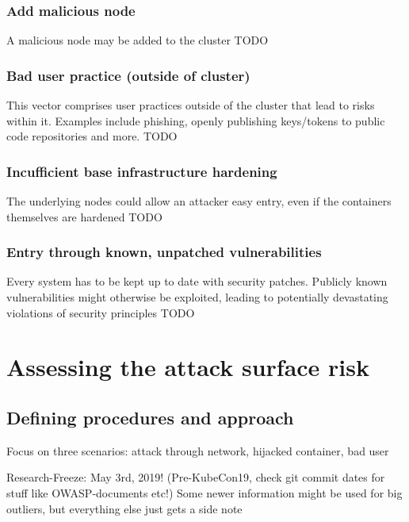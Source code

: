 \subsection{Add malicious node}
A malicious node may be added to the cluster
TODO

\subsection{Bad user practice (outside of cluster)}
This vector comprises user practices outside of the cluster that lead to risks within it. Examples include phishing, openly publishing keys/tokens to public code repositories and more.
TODO

\subsection{Incufficient base infrastructure hardening}
The underlying nodes could allow an attacker easy entry, even if the containers themselves are hardened
TODO

\subsection{Entry through known, unpatched vulnerabilities}
Every system has to be kept up to date with  security patches. Publicly known vulnerabilities might otherwise be exploited, leading to potentially devastating violations of security principles
TODO


\chapter{Assessing the attack surface risk}

\section{Defining procedures and approach}

Focus on three scenarios: attack through network, hijacked container, bad user

Research-Freeze: May 3rd, 2019! (Pre-KubeCon19, check git commit dates for stuff like OWASP-documents etc!)
Some newer information might be used for big outliers, but everything else just gets a side note

